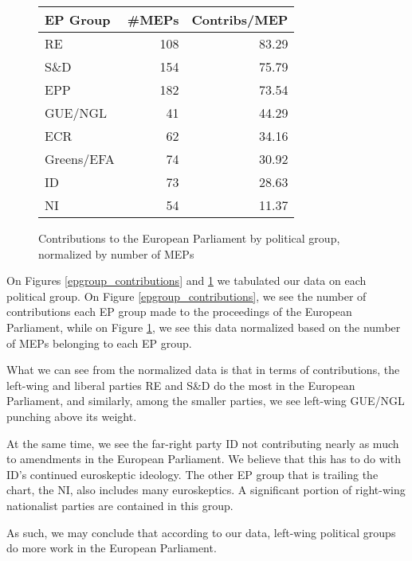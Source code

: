 \documentclass[lettersize,journal]{IEEEtran}
\begin{document}
\begin{figure}[h]
	\begin{center}
		\begin{tabular}{| l | r | r |}
			\hline
			EP Group & \#MEPs & Contribs/MEP\\
			\hline
			RE & 108 & 83.29 \\
			S\&D & 154 & 75.79 \\
			EPP & 182 & 73.54 \\
			GUE/NGL & 41 & 44.29 \\
			ECR & 62 & 34.16 \\
			Greens/EFA & 74 & 30.92 \\
			ID & 73 & 28.63 \\
			NI & 54 & 11.37 \\
			\hline
		\end{tabular}
		\caption{Contributions to the European Parliament by political group, normalized by number of MEPs}
		\label{epgroup_contributions_per_mep}
	\end{center}
\end{figure}

On Figures \ref{epgroup_contributions} and \ref{epgroup_contributions_per_mep} we tabulated our data on each political group. On Figure \ref{epgroup_contributions}, we see the number of contributions each EP group made to the proceedings of the European Parliament, while on Figure \ref{epgroup_contributions_per_mep}, we see this data normalized based on the number of MEPs belonging to each EP group.

What we can see from the normalized data is that in terms of contributions, the left-wing and liberal parties RE and S\&D do the most in the European Parliament, and similarly, among the smaller parties, we see left-wing GUE/NGL punching above its weight.

At the same time, we see the far-right party ID not contributing nearly as much to amendments in the European Parliament. We believe that this has to do with ID's continued euroskeptic ideology. The other EP group that is trailing the chart, the NI, also includes many euroskeptics. A significant portion of right-wing nationalist parties are contained in this group.

As such, we may conclude that according to our data, left-wing political groups do more work in the European Parliament.
\end{document}
